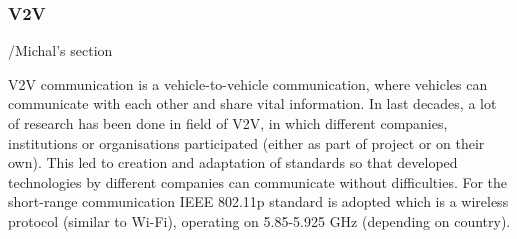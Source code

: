 \subsubsection{V2V}

/Michal's section

V2V communication is a vehicle-to-vehicle communication, where vehicles can communicate with each other and share vital information. In last decades, a lot of research has been done in field of V2V, in which different companies, institutions or organisations participated (either as part of project or on their own). This led to creation and adaptation of standards so that developed technologies by different companies can communicate without difficulties. For the short-range communication IEEE 802.11p standard is adopted which is a wireless protocol (similar to Wi-Fi), operating on 5.85-5.925 GHz (depending on country).